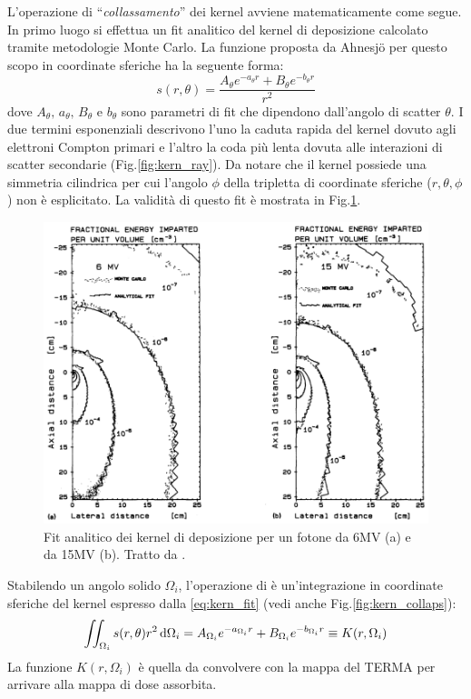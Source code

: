 {L'operazione di \textquotedblleft\textit{collassamento}\textquotedblright{} dei kernel avviene matematicamente come segue. In primo luogo si effettua un fit analitico del kernel di deposizione calcolato tramite metodologie Monte Carlo. La funzione proposta da Ahnesj\"{o} per questo scopo in coordinate sferiche ha la seguente forma:
\begin{equation}
\label{eq:kern_fit}
s(r,\theta) = \frac{A_\theta e^{-a_\theta r} + B_\theta e^{-b_\theta r}}{r^2}
\end{equation}
dove $A_\theta,\,a_\theta,\,B_\theta$ e $b_\theta$ sono parametri di fit che dipendono dall'angolo di scatter $\theta$. I due termini esponenziali descrivono l'uno la caduta rapida del kernel dovuto agli elettroni Compton primari e l'altro la coda più lenta dovuta alle interazioni di scatter secondarie (Fig.\ref{fig:kern_ray}). Da notare che il kernel possiede una simmetria cilindrica per cui l'angolo $\phi$ della tripletta di coordinate sferiche ($r,\theta,\phi$) non è esplicitato. La validità di questo fit è mostrata in Fig.\ref{fig:kern_fit}.
\begin{figure}
\centering
\includegraphics[width=.8\textwidth]{./cap1/kern_fit.png}
\caption{Fit analitico dei kernel di deposizione per un fotone da 6MV (a) e da 15MV (b). Tratto da \cite{Ahnesjo1989}.}
\label{fig:kern_fit}
\end{figure}

Stabilendo un angolo solido $\Omega_i$, l'operazione di  è un'integrazione in coordinate sferiche del kernel espresso dalla \eqref{eq:kern_fit} (vedi anche Fig.\ref{fig:kern_collaps}):
\begin{equation}
\iint_{\Omega_i} s(r,\theta) r^2\,\text{d} \Omega_i = A_{\Omega_i} e^{-a_{\Omega_i} r} + B_{\Omega_i} e^{-b_{\Omega_i} r} \equiv K(r,\Omega_i)
\end{equation}
La funzione $K(r,\Omega_i)$ è quella da convolvere con la mappa del TERMA per arrivare alla mappa di dose assorbita.

}
